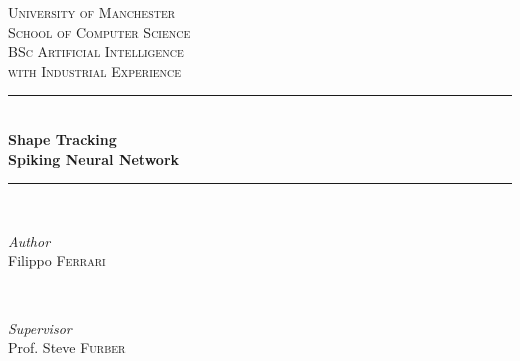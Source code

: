 \begin{titlepage}
	\newcommand{\HRule}{\rule{\linewidth}{0.5mm}} %
	
	\center %
	
	
	\textsc{\LARGE University of Manchester}\\[0.75cm] %
	
	\textsc{\Large School of Computer Science}\\[0.75cm] %
	
    
	\textsc{\large BSc Artificial Intelligence\\
	with Industrial Experience}\\[1.25cm] %
	
	
	\HRule\\[0.4cm]
	
	{\huge\bfseries Shape Tracking\\
	Spiking Neural Network}\\[0.4cm] %
	
	\HRule\\[1.5cm]
	
	
	\begin{minipage}{0.4\textwidth}
		\begin{flushleft}
			\large
			\textit{Author}\\
			Filippo \textsc{Ferrari} %
		\end{flushleft}
	\end{minipage}
	~
	\begin{minipage}{0.4\textwidth}
		\begin{flushright}
			\large
			\textit{Supervisor}\\
			Prof. Steve \textsc{Furber} %
		\end{flushright}
	\end{minipage}
	
	\vfill
	

\end{titlepage}
